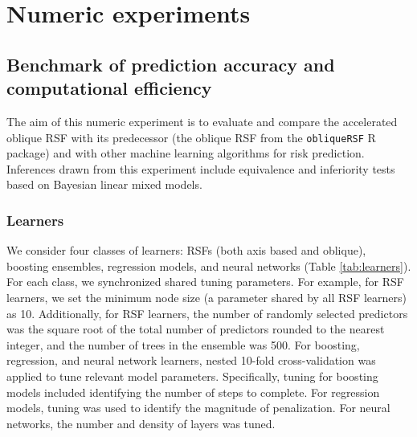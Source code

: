 \documentclass[twoside,11pt]{article}\usepackage[]{graphicx}\usepackage[]{xcolor}
\newcommand{\tabref}[1]{Table \ref{#1}}
\begin{document}
\section{Numeric experiments}

\subsection{Benchmark of prediction accuracy and computational efficiency} \label{sec:bm_pred}

The aim of this numeric experiment is to evaluate and compare the accelerated oblique RSF with its predecessor (the oblique RSF from the \texttt{obliqueRSF} R package) and with other machine learning algorithms for risk prediction. Inferences drawn from this experiment include equivalence and inferiority tests based on Bayesian linear mixed models.

\subsubsection{Learners} \label{sec:learners}

We consider four classes of learners: RSFs (both axis based and oblique), boosting ensembles, regression models, and neural networks (\tabref{tab:learners}). For each class, we synchronized shared tuning parameters. For example, for RSF learners, we set the minimum node size (a parameter shared by all RSF learners) as 10. Additionally, for RSF learners, the number of randomly selected predictors was the square root of the total number of predictors rounded to the nearest integer, and the number of trees in the ensemble was 500. For boosting, regression, and neural network learners, nested 10-fold cross-validation was applied to tune relevant model parameters. Specifically, tuning for boosting models included identifying the number of steps to complete. For regression models, tuning was used to identify the magnitude of penalization. For neural networks, the number and density of layers was tuned.
\end{document}
